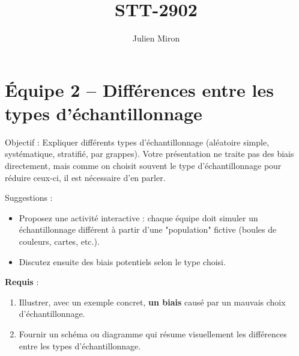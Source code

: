 \documentclass{article}
\title{STT-2902}
\author{Julien Miron}
\begin{document}
\section*{Équipe 2 – Différences entre les types d’échantillonnage}

Objectif : Expliquer différents types d’échantillonnage (aléatoire simple, systématique, stratifié, par grappes). Votre présentation ne traite pas des biais directement, mais comme on choisit souvent le type d'échantillonnage pour réduire ceux-ci, il est nécessaire d'en parler.

\vspace{1cm}
Suggestions :
\begin{itemize}
    \item Proposez une activité interactive : chaque équipe doit simuler un échantillonnage différent à partir d’une "population" fictive (boules de couleurs, cartes, etc.).
    \item Discutez ensuite des biais potentiels selon le type choisi.

\end{itemize}

\vspace{1cm}
\textbf{Requis} :
\begin{enumerate}
    \item Illustrer, avec un exemple concret, \textbf{un biais} causé par un mauvais choix d’échantillonnage.
    \item Fournir un schéma ou diagramme qui résume visuellement les différences entre les types d’échantillonnage.
\end{enumerate}
\end{document}
